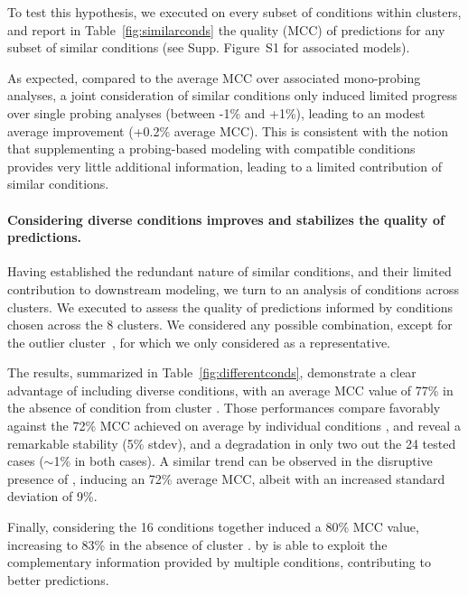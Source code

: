 \documentclass[a4,center,fleqn]{NAR}
\begin{document}
To test this hypothesis, we executed \OurTool{} on every subset of conditions within clusters, and report in Table~\ref{fig:similarconds} the quality (MCC) of predictions for any subset of similar conditions (see Supp. Figure~S1 for associated models). 
 
As expected, compared to the average MCC over associated mono-probing analyses, a joint consideration of similar conditions only induced limited progress over single probing analyses (between -1\% and +1\%), leading to an modest average improvement (+0.2\% average MCC). This is consistent with the notion that supplementing a probing-based modeling with compatible conditions provides very little additional information, leading to a limited contribution of similar conditions. 



\paragraph{Considering diverse conditions improves and stabilizes the quality of predictions.} 
Having established the redundant nature of similar conditions, and their limited contribution to downstream modeling, we turn to an analysis of conditions across clusters.  We executed \OurTool{} to assess the quality of predictions informed by conditions chosen across the 8 clusters. We considered any possible combination, except for the outlier cluster~, for which we only considered \NAICE as a representative.

The results, summarized in Table~\ref{fig:differentconds}, demonstrate a clear advantage of including diverse conditions, with an average MCC value of 77\% in the absence of condition from cluster . Those performances compare favorably against the 72\% MCC achieved on average by individual conditions , and reveal a remarkable stability (5\% stdev), and a degradation in only two out the 24 tested cases ($\sim$1\%  in both cases).  A similar trend can be observed in the disruptive presence of \NAICE, inducing an 72\% average MCC, albeit with an increased standard deviation of 9\%.

Finally, considering the 16 conditions together induced a 80\% MCC value, increasing to 83\% in the absence of cluster .  by \OurTool{} is able to exploit the complementary information provided by multiple conditions, contributing to better predictions.
\end{document}
